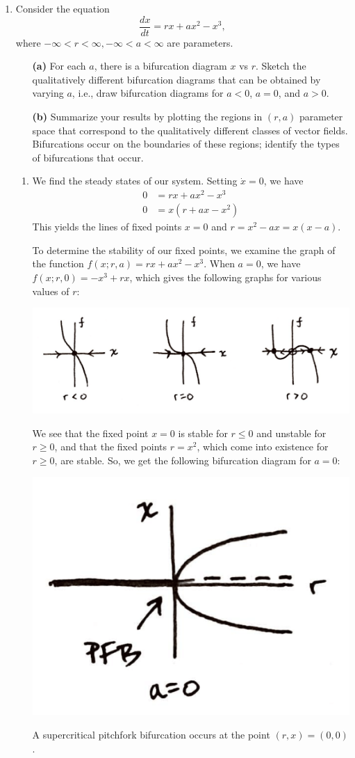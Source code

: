 \documentclass[10pt,letterpaper]{report}
\begin{document}
\begin{enumerate}

\item \begin{qbox}
Consider the equation
\[
\frac{dx}{dt} = rx + ax^2 - x^3,
\]
where $-\infty < r < \infty, -\infty < a < \infty$ are parameters.
\begin{itemize}
    \item[\textbf{(a)}] For each $a$, there is a bifurcation diagram $x$ vs $r$. Sketch the qualitatively different bifurcation diagrams that can be obtained by varying $a$, i.e., draw bifurcation diagrams for $a < 0$, $a = 0$, and $a > 0$. 
    
    \item[\textbf{(b)}] Summarize your results by plotting the regions in $(r, a)$ parameter space that correspond to the qualitatively different classes of vector fields. Bifurcations occur on the boundaries of these regions; identify the types of bifurcations that occur.
\end{itemize}
\end{qbox}

\begin{enumerate}
    \item We find the steady states of our system. Setting $\dot x = 0$, we have
    \begin{align*}
        0 &= rx + ax^2 - x^3 \\
        0 &= x\left(r + ax - x^2\right)
    \end{align*}
    This yields the lines of fixed points $x = 0$ and $r = x^2 - ax = x(x - a)$. 
    
    To determine the stability of our fixed points, we examine the graph of the function $f(x; r, a) = rx + ax^2 - x^3$. When $a = 0$, we have $f(x;r,0) = -x^3 + rx$, which gives the following graphs for various values of $r:$
    \begin{center}
        \includegraphics[height=0.2\textwidth]{img/2020F1a1.png}
    \end{center}
    We see that the fixed point $x = 0$ is stable for $r \leq 0$ and unstable for $r \geq 0$, and that the fixed points $r = x^2$, which come into existence for $r \geq 0$, are stable. So, we get the following bifurcation diagram for $a = 0$:
    \begin{center}
        \includegraphics[height=0.2\textwidth]{img/2020F1a2.png}
    \end{center}
    A supercritical pitchfork bifurcation occurs at the point $(r, x) = (0, 0)$.
    

\end{enumerate}
\end{enumerate}
\end{document}
